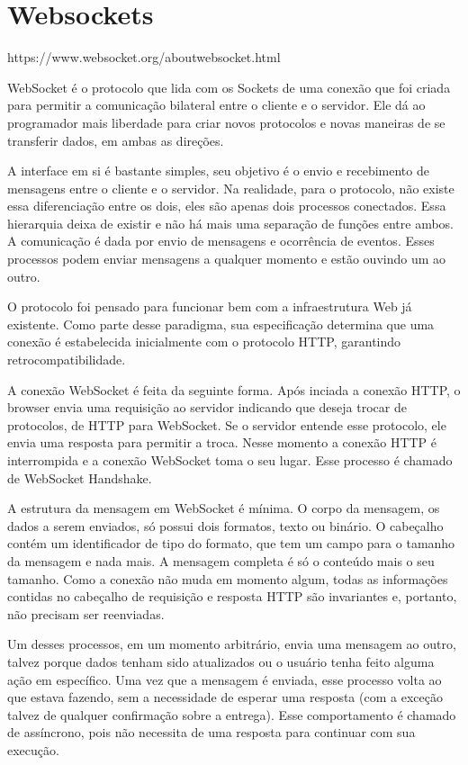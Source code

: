 \documentclass[a4paper,12pt]{article}
\begin{document}
\section{Websockets}

https://www.websocket.org/aboutwebsocket.html

WebSocket é o protocolo que lida com os Sockets de uma conexão que foi criada para permitir a comunicação bilateral entre o cliente e o servidor. Ele dá ao programador mais liberdade para criar novos protocolos e novas maneiras de se transferir dados, em ambas as direções.

A interface em si é bastante simples, seu objetivo é o envio e recebimento de mensagens entre o cliente e o servidor. Na realidade, para o protocolo, não existe essa diferenciação entre os dois, eles são apenas dois processos conectados. Essa hierarquia deixa de existir e não há mais uma separação de funções entre ambos. A comunicação é dada por envio de mensagens e ocorrência de eventos. Esses processos podem enviar mensagens a qualquer momento e estão ouvindo um ao outro.

O protocolo foi pensado para funcionar bem com a infraestrutura Web já existente. Como parte desse paradigma, sua especificação determina que uma conexão é estabelecida inicialmente com o protocolo HTTP, garantindo retrocompatibilidade.

A conexão WebSocket é feita da seguinte forma. Após inciada a conexão HTTP, o browser envia uma requisição ao servidor indicando que deseja trocar de protocolos, de HTTP para WebSocket. Se o servidor entende esse protocolo, ele envia uma resposta para permitir a troca. Nesse momento a conexão HTTP é interrompida e a conexão WebSocket toma o seu lugar. Esse processo é chamado de WebSocket Handshake.

A estrutura da mensagem em WebSocket é mínima. O corpo da mensagem, os dados a serem enviados, só possui dois formatos, texto ou binário. O cabeçalho contém um identificador de tipo do formato, que tem um campo para o tamanho da mensagem e nada mais. A mensagem completa é só o conteúdo mais o seu tamanho. Como a conexão não muda em momento algum, todas as informações contidas no cabeçalho de requisição e resposta HTTP são invariantes e, portanto, não precisam ser reenviadas.

Um desses processos, em um momento arbitrário, envia uma mensagem ao outro, talvez porque dados tenham sido atualizados ou o usuário tenha feito alguma ação em específico. Uma vez que a mensagem é enviada, esse processo volta ao que estava fazendo, sem a necessidade de esperar uma resposta (com a exceção talvez de qualquer confirmação sobre a entrega). Esse comportamento é chamado de assíncrono, pois não necessita de uma resposta para continuar com sua execução.
\end{document}
